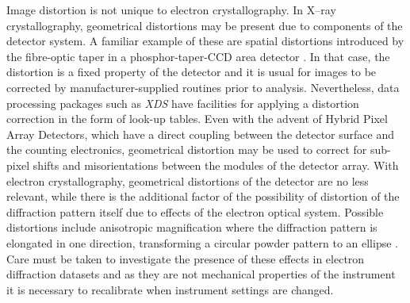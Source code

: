 \documentclass[preprint]{iucr}
\newcommand{\xds}{\emph{XDS}\xspace}
\begin{document}
Image distortion is not unique to electron crystallography. In X--ray
crystallography, geometrical distortions may be present due to components
of the detector system. A familiar example of these are spatial distortions
introduced by the fibre-optic taper in a phosphor-taper-CCD area detector
\cite{Stanton1992}. In that case, the distortion is a fixed property of the
detector and it is usual for images to be corrected by manufacturer-supplied
routines prior to analysis. Nevertheless, data processing packages such as \xds
have facilities for applying a distortion correction in the form of look-up
tables. Even with the advent of Hybrid Pixel Array Detectors, which have a
direct coupling between the detector surface and the counting electronics,
geometrical distortion may be used to correct for sub-pixel shifts and
misorientations between the modules of the detector array. With electron
crystallography, geometrical distortions of the detector are no less relevant,
while there is the additional factor of the possibility of distortion of
the diffraction pattern itself due to effects of the electron optical system.
Possible distortions include
anisotropic magnification where the diffraction pattern is elongated
in one direction, transforming a circular powder pattern to an ellipse
\cite{lenscorr_2dx:2006,Clabbers2017}. Care must be taken to investigate the
presence of these effects in electron diffraction datasets and as they are
not mechanical properties of the instrument it is necessary to recalibrate
when instrument settings are changed.
\end{document}
